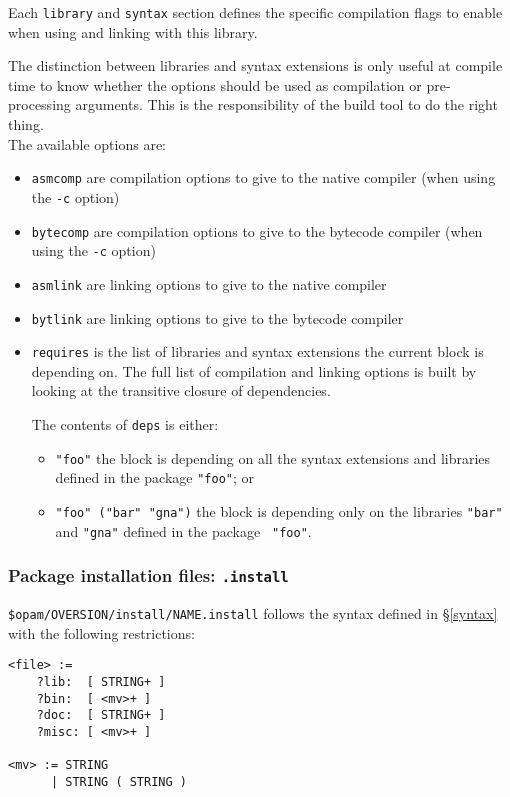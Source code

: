 \documentclass[a4paper,11pt]{article}
\begin{document}
Each {\tt library} and {\tt syntax} section defines the specific
compilation flags to enable when using and linking with this library.

The distinction between libraries and syntax extensions is only useful
at compile time to know whether the options should be used as
compilation or pre-processing arguments. This is the responsibility of
the build tool to do the right thing. \\

The available options are:

\begin{itemize}
\item {\tt asmcomp} are compilation options to give to the native
  compiler (when using the {\tt -c} option)
\item {\tt bytecomp} are compilation options to give to the bytecode
  compiler (when using the {\tt -c} option)
\item {\tt asmlink} are linking options to give to the native compiler 
\item {\tt bytlink} are linking options to give to the bytecode
  compiler
\item {\tt requires} is the list of libraries and syntax extensions
  the current block is depending on. The full list of compilation
  and linking options is built by looking at the transitive closure of
  dependencies.

  The contents of {\tt deps} is either:
  \begin{itemize}
  \item {\tt "foo"} the block is depending on all the syntax
    extensions and libraries defined in the package {\tt "foo"}; or
  \item {\tt "foo" ("bar" "gna")} the block is depending only on the
    libraries {\tt "bar"} and {\tt "gna"} defined in the package {\tt
      "foo"}.
  \end{itemize}
\end{itemize}

\subsubsection{Package installation files: {\tt .install}}
\label{dotinstall}

\verb+$opam/OVERSION/install/NAME.install+ follows the syntax defined
in \S\ref{syntax} with the following restrictions:

{\small
\begin{Verbatim}[frame=single]
<file> :=
    ?lib:  [ STRING+ ]
    ?bin:  [ <mv>+ ]
    ?doc:  [ STRING+ ]
    ?misc: [ <mv>+ ]

<mv> := STRING
      | STRING ( STRING )
\end{Verbatim}
}
\end{document}
